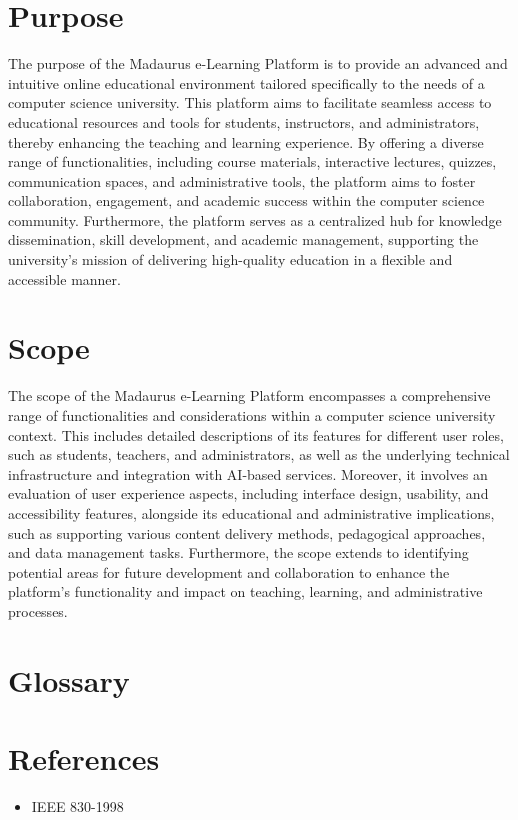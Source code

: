 \documentclass{IEEEtran}
\begin{document}
\section{Purpose}
The purpose of the Madaurus e-Learning Platform is to provide an advanced and intuitive online educational environment tailored specifically to the needs of a computer science university. This platform aims to facilitate seamless access to educational resources and tools for students, instructors, and administrators, thereby enhancing the teaching and learning experience. By offering a diverse range of functionalities, including course materials, interactive lectures, quizzes, communication spaces, and administrative tools, the platform aims to foster collaboration, engagement, and academic success within the computer science community. Furthermore, the platform serves as a centralized hub for knowledge dissemination, skill development, and academic management, supporting the university's mission of delivering high-quality education in a flexible and accessible manner.
\section{Scope}

The scope of the Madaurus e-Learning Platform encompasses a comprehensive range of functionalities and considerations within a computer science university context. This includes detailed descriptions of its features for different user roles, such as students, teachers, and administrators, as well as the underlying technical infrastructure and integration with AI-based services. Moreover, it involves an evaluation of user experience aspects, including interface design, usability, and accessibility features, alongside its educational and administrative implications, such as supporting various content delivery methods, pedagogical approaches, and data management tasks. Furthermore, the scope extends to identifying potential areas for future development and collaboration to enhance the platform's functionality and impact on teaching, learning, and administrative processes.

\section{Glossary}

\section{References}
\begin{itemize}
    \item IEEE 830-1998
\end{itemize}
\end{document}
